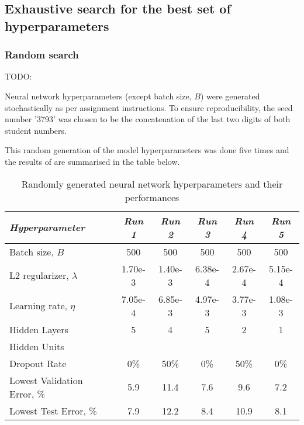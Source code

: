 \documentclass[a4paper,12pt]{article}
\begin{document}
\clearpage
\subsection{Exhaustive search for the best set of hyperparameters}
\subsubsection{Random search}
TODO: 

Neural network hyperparameters (except batch size, $B$) were generated stochastically as per assignment instructions. To ensure reproducibility, the seed number '3793' was chosen to be the concatenation of the last two digits of both student numbers. 

This random generation of the model hyperparameters was done five times and the results of are summarised in the table below.

\begin{table}[!htb]
\centering
\caption{Randomly generated neural network hyperparameters and their performances}
\label{table:NN_RandomGeneration}
\vspace{0.5em}
\begin{tabular}{|l|c c c c c|} \hline
\textit{Hyperparameter} & \textit{Run 1} & \textit{Run 2} & \textit{Run 3} & \textit{Run 4} & \textit{Run 5} \\ \hline
Batch size, $B$ & 500 & 500 & 500 & 500 & 500 \\
L2 regularizer, $\lambda$ & 1.70e-3 & 1.40e-3 & 6.38e-4 & 2.67e-4 & 5.15e-4  \\
Learning rate, $\eta$ & 7.05e-4 & 6.85e-3 & 4.97e-3 & 3.77e-3 & 1.08e-3 \\
Hidden Layers & 5 & 4 & 5 & 2 & 1 \\
Hidden Units & \footnotemark & \footnotemark & \footnotemark & \footnotemark & \footnotemark \\
Dropout Rate & 0\% & 50\% & 0\% & 50\% & 0\% \\
\hline
\small{Lowest Validation Error, \%} & 5.9 & 11.4 & 7.6 & 9.6 & 7.2  \\
Lowest Test Error, \% & 7.9 & 12.2 & 8.4 & 10.9 & 8.1 \\
\hline
\end{tabular}
\end{table}
\end{document}
